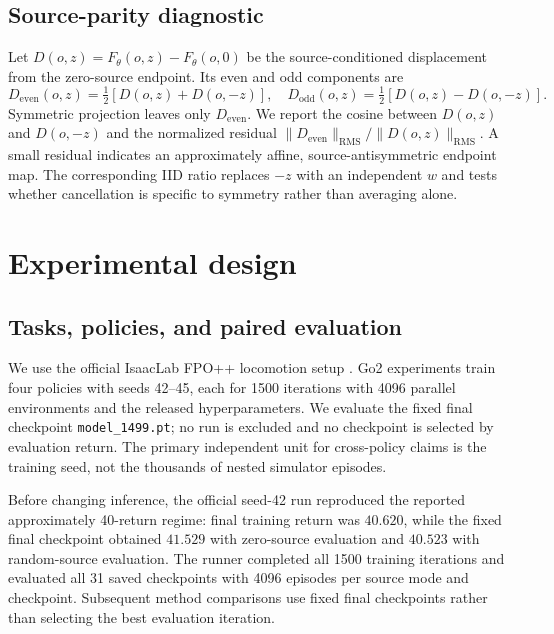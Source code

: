 \documentclass{article}
\begin{document}
\subsection{Source-parity diagnostic}

Let $D(o,z)=F_\theta(o,z)-F_\theta(o,0)$ be the source-conditioned displacement
from the zero-source endpoint. Its even and odd components are
\begin{equation}
 D_{\mathrm{even}}(o,z)=\tfrac{1}{2}[D(o,z)+D(o,-z)],\quad
 D_{\mathrm{odd}}(o,z)=\tfrac{1}{2}[D(o,z)-D(o,-z)].
\end{equation}
Symmetric projection leaves only $D_{\mathrm{even}}$. We report the cosine
between $D(o,z)$ and $D(o,-z)$ and the normalized residual
$\lVert D_{\mathrm{even}}\rVert_{\mathrm{RMS}}/
\lVert D(o,z)\rVert_{\mathrm{RMS}}$. A small residual indicates an
approximately affine, source-antisymmetric endpoint map. The corresponding IID
ratio replaces $-z$ with an independent $w$ and tests whether cancellation is
specific to symmetry rather than averaging alone.

\section{Experimental design}

\subsection{Tasks, policies, and paired evaluation}

We use the official IsaacLab FPO++ locomotion setup
\citep{yi2026flowcontrol}. Go2 experiments train four policies with seeds
42--45, each for 1500 iterations with 4096 parallel environments and the
released hyperparameters. We evaluate the fixed final checkpoint
\texttt{model\_1499.pt}; no run is excluded and no checkpoint is selected by
evaluation return. The primary independent unit for cross-policy claims is the
training seed, not the thousands of nested simulator episodes.

Before changing inference, the official seed-42 run reproduced the reported
approximately 40-return regime: final training return was $40.620$, while the
fixed final checkpoint obtained $41.529$ with zero-source evaluation and
$40.523$ with random-source evaluation. The runner completed all 1500 training
iterations and evaluated all 31 saved checkpoints with 4096 episodes per source
mode and checkpoint. Subsequent method comparisons use fixed final checkpoints
rather than selecting the best evaluation iteration.
\end{document}

